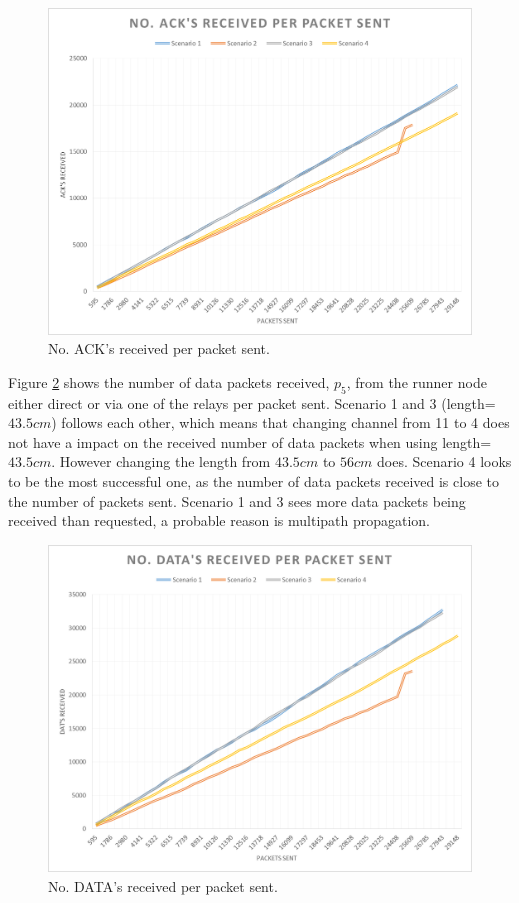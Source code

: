 \begin{figure}[h]
	\centering
	\includegraphics[width=1\linewidth]{results/NoAckReceived}
	\caption{No. ACK's received per packet sent.}
	\label{fig:noackreceived}
\end{figure}

\noindent Figure \ref{fig:nodatareceived} shows the number of data packets received, $p_5$, from the runner node either direct or via one of the relays per packet sent. Scenario 1 and 3 (length=$43.5cm$) follows each other, which means that changing channel from 11 to 4 does not have a impact on the received number of data packets when using length=$43.5cm$. However changing the length from $43.5cm$ to $56cm$ does. Scenario 4 looks to be the most successful one, as the number of data packets received is close to the number of packets sent. Scenario 1 and 3 sees more data packets being received than requested, a probable reason is multipath propagation.

\begin{figure}[h]
	\centering
	\includegraphics[width=1\linewidth]{results/NoDataReceived}
	\caption{No. DATA's received per packet sent.}
	\label{fig:nodatareceived}
\end{figure}

